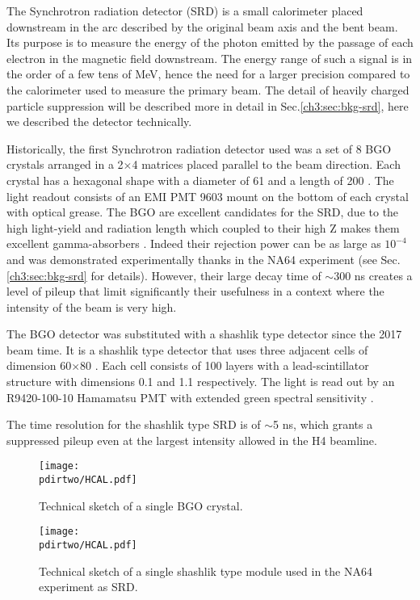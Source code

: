 The Synchrotron radiation detector (SRD) is a small calorimeter placed downstream in the arc described by the original beam axis and the bent beam. Its purpose is to measure the energy of the photon emitted by the passage of each electron in the magnetic field downstream. The energy range of such a signal is in the order of a few tens of MeV, hence the need for a larger precision compared to the calorimeter used to measure the primary beam. The detail of heavily charged particle suppression will be described more in detail in Sec.\ref{ch3:sec:bkg-srd}, here we described the detector technically.

Historically, the first Synchrotron radiation detector used was a set of 8 BGO crystals arranged in a 2$\times$4 matrices placed parallel to the beam direction. Each crystal has a hexagonal shape with a diameter of 61 \mmi and a length of 200 \mmi. The light readout consists of an EMI PMT 9603 mount on the bottom of each crystal with optical grease. The BGO are excellent candidates for the SRD, due to the high light-yield and radiation length which coupled to their high Z makes them excellent gamma-absorbers \cite{bgo-crystal}. Indeed their rejection power can be as large as $10^{-4}$ and was demonstrated experimentally thanks in the NA64 experiment (see Sec.\ref{ch3:sec:bkg-srd} for details). However, their large decay time of $\sim$300 \si{ns} creates a level of pileup that limit significantly their usefulness in a context where the intensity of the beam is very high.

The BGO detector was substituted with a shashlik type detector since the 2017 beam time. It is a shashlik type detector that uses three adjacent cells of dimension 60$\times$80 \mmi. Each cell consists of 100 layers with a lead-scintillator structure with dimensions 0.1 \mmi and 1.1 \mmi respectively. The light is read out by an R9420-100-10 Hamamatsu PMT with extended green spectral sensitivity \cite{hamamatsu-R9420-100-10}.

The time resolution for the shashlik type SRD is of $\sim$5 \si{ns}, which grants a suppressed pileup even at the largest intensity allowed in the H4 beamline.

\begin{figure}[bth!]
\centering
\texttt{[image: \\pdirtwo/HCAL.pdf]}
\caption[BGO sketch]{Technical sketch of a single BGO crystal.}
\label{fig:bgo-sketch}
\end{figure}

\begin{figure}[bth!]
\centering
\texttt{[image: \\pdirtwo/HCAL.pdf]}
\caption[SRD sketch]{Technical sketch of a single shashlik type module used in the NA64 experiment as SRD.}
\label{fig:srd-sketch}
\end{figure}

